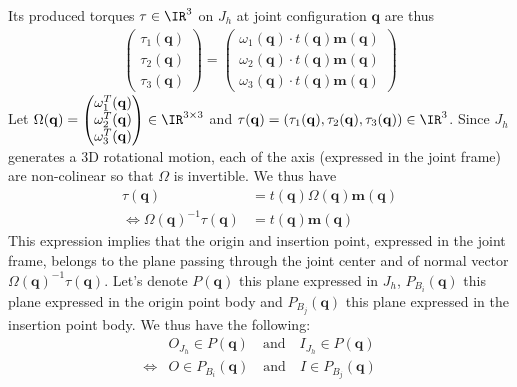 Its produced torques $\tau\in\IR^3$ on $J_h$ at joint configuration $\mathbf{q}$ are thus 
\begin{align*}
    \begin{pmatrix}
        \tau_1(\mathbf{q}) \\
        \tau_2(\mathbf{q}) \\
        \tau_3(\mathbf{q})
    \end{pmatrix} = \begin{pmatrix}
        \omega_1(\mathbf{q}) \cdot t(\mathbf{q})\mathbf{m}(\mathbf{q}) \\
        \omega_2(\mathbf{q}) \cdot t(\mathbf{q})\mathbf{m}(\mathbf{q}) \\
        \omega_3(\mathbf{q}) \cdot t(\mathbf{q})\mathbf{m}(\mathbf{q})
    \end{pmatrix}
\end{align*}
Let $\Omega(\mathbf{q}) = \begin{pmatrix}
    \omega_1^T(\mathbf{q}) \\
    \omega_2^T(\mathbf{q}) \\
    \omega_3^T(\mathbf{q})
\end{pmatrix} \in \IR^{3\times 3}$ and $\tau(\mathbf{q}) = (\tau_1(\mathbf{q}), \tau_2(\mathbf{q}), \tau_3(\mathbf{q}))\in \IR^3$. 
Since $J_h$ generates a 3D rotational motion, each of the axis (expressed in the joint frame) are non-colinear so that $\Omega$ is invertible. We thus have
\begin{align*}
    \tau(\mathbf{q}) &= t(\mathbf{q})\Omega(\mathbf{q})\mathbf{m}(\mathbf{q}) \\
    \iff \Omega(\mathbf{q})^{-1}\tau(\mathbf{q}) &= t(\mathbf{q})\mathbf{m}(\mathbf{q})
\end{align*}
This expression implies that the origin and insertion point, expressed in the joint frame, belongs to the plane passing through the joint center and of normal vector $\Omega(\mathbf{q})^{-1}\tau(\mathbf{q})$. Let's denote $P(\mathbf{q})$ this plane expressed in $J_h$, $P_{B_i}(\mathbf{q})$ this plane expressed in the origin point body and $P_{B_j}(\mathbf{q})$ this plane expressed in the insertion point body. We thus have the following:
\begin{align*}
    & O_{J_h}\in P(\mathbf{q}) \quad \text{and} \quad I_{J_h}\in P(\mathbf{q}) \\
    \iff & O\in P_{B_i}(\mathbf{q}) \quad \text{and} \quad I\in P_{B_j}(\mathbf{q})
\end{align*}




